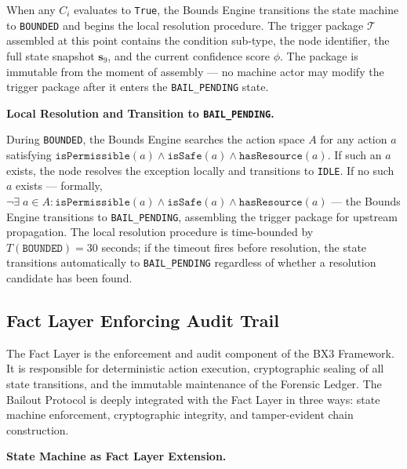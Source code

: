\bigskip

When any $C_i$ evaluates to \texttt{True}, the Bounds Engine transitions the state
machine to \texttt{BOUNDED} and begins the local resolution procedure. The trigger
package $\mathcal{T}$ assembled at this point contains the condition sub-type, the node
identifier, the full state snapshot $\mathbf{s}_9$, and the current confidence score
$\phi$. The package is immutable from the moment of assembly — no machine actor may
modify the trigger package after it enters the \texttt{BAIL\_PENDING} state.

\bigskip

\noindent\textbf{Local Resolution and Transition to \texttt{BAIL\_PENDING}.}

During \texttt{BOUNDED}, the Bounds Engine searches the action space $A$ for any action
$a$ satisfying $\texttt{isPermissible}(a) \land \texttt{isSafe}(a) \land \texttt{hasResource}(a)$.
If such an $a$ exists, the node resolves the exception locally and transitions to
\texttt{IDLE}. If no such $a$ exists — formally, $\neg \exists \; a \in A :
\texttt{isPermissible}(a) \land \texttt{isSafe}(a) \land \texttt{hasResource}(a)$ — the
Bounds Engine transitions to \texttt{BAIL\_PENDING}, assembling the trigger package for
upstream propagation. The local resolution procedure is time-bounded by $T(\texttt{BOUNDED})
= 30$ seconds; if the timeout fires before resolution, the state transitions
automatically to \texttt{BAIL\_PENDING} regardless of whether a resolution candidate
has been found.


\subsection{Fact Layer Enforcing Audit Trail}
\label{sec:fact-layer}

The Fact Layer is the enforcement and audit component of the BX3 Framework. It is
responsible for deterministic action execution, cryptographic sealing of all state
transitions, and the immutable maintenance of the Forensic Ledger. The Bailout
Protocol is deeply integrated with the Fact Layer in three ways: state machine
enforcement, cryptographic integrity, and tamper-evident chain construction.

\bigskip

\noindent\textbf{State Machine as Fact Layer Extension.}

